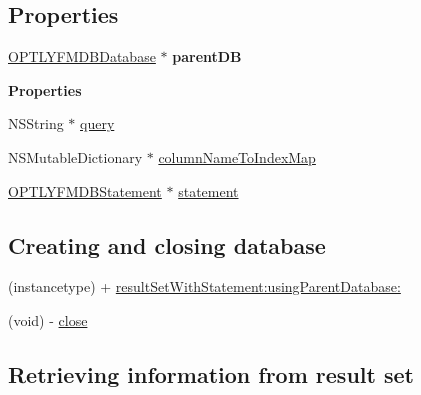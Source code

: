 \subsection*{Properties}
\begin{DoxyCompactItemize}
\item 
\mbox{\label{interface_o_p_t_l_y_f_m_d_b_result_set_ac9bd0c449ab199280aaeb642b039aefa}} 
\mbox{\hyperlink{interface_o_p_t_l_y_f_m_d_b_database}{O\+P\+T\+L\+Y\+F\+M\+D\+B\+Database}} $\ast$ {\bfseries parent\+DB}
\end{DoxyCompactItemize}
\begin{Indent}\textbf{ Properties}\par
{\em 

 

 }\begin{DoxyCompactItemize}
\item 
N\+S\+String $\ast$ \mbox{\hyperlink{interface_o_p_t_l_y_f_m_d_b_result_set_a2f247f56c6b1c242b89b38d5e55ac9fb}{query}}
\item 
N\+S\+Mutable\+Dictionary $\ast$ \mbox{\hyperlink{interface_o_p_t_l_y_f_m_d_b_result_set_aff55486dac355fb5d90db027a8797fcc}{column\+Name\+To\+Index\+Map}}
\item 
\mbox{\hyperlink{interface_o_p_t_l_y_f_m_d_b_statement}{O\+P\+T\+L\+Y\+F\+M\+D\+B\+Statement}} $\ast$ \mbox{\hyperlink{interface_o_p_t_l_y_f_m_d_b_result_set_ac1f92d7773e65a7b06489992f8758857}{statement}}
\end{DoxyCompactItemize}
\end{Indent}
\subsection*{Creating and closing database}
\label{_amgrp9a90ac90a86e18a43da006011947f137}%


 

 \begin{DoxyCompactItemize}
\item 
(instancetype) + \mbox{\hyperlink{interface_o_p_t_l_y_f_m_d_b_result_set_aa8f1fbdb3cee5f32ae5a6c133519e8fe}{result\+Set\+With\+Statement\+:using\+Parent\+Database\+:}}
\item 
(void) -\/ \mbox{\hyperlink{interface_o_p_t_l_y_f_m_d_b_result_set_a446f25547db5f2b36547ea9f2da75529}{close}}
\end{DoxyCompactItemize}
\subsection*{Retrieving information from result set}
\label{_amgrpe6c219bc0e9e934ed2f5bbb2f99b6bd3}%


